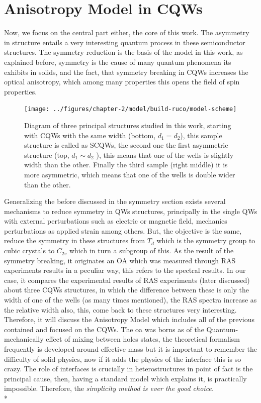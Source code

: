 \section{Anisotropy Model in CQWs}
\label{subsec:chapter-2-anisotropy-model}
\vspace{-10mm} 
Now, we focus on the central part either, the core of this work. The asymmetry in structure entails a very interesting quantum process in these semiconductor structures. The symmetry reduction is the basis of the model in this work, as explained before, symmetry is the cause of many quantum phenomena its exhibits in solids, and the fact, that symmetry breaking in \gls{CQWs} increases the optical anisotropy, which among many properties this opens the field of spin properties\cite{sivalertporn2012direct,averkiev2006spin,kotova2016optical,schonhuber2014inelastic,tronc2012spin}.\\
\begin{figure}[b]
	\centering
	\texttt{[image: ../figures/chapter-2/model/build-ruco/model-scheme]}
	\caption{Diagram of three principal structures studied in this work, starting with CQWs with the same width (bottom, $d_{1}=d_{2}$), this sample structure is called as SCQWs, the second one the first asymmetric structure (top, $d_{1}\sim d_{2}$ ), this means that one of the wells is slightly width than the other. Finally the third sample (right middle) it is more asymmetric, which means that one of the wells is double wider than the other.    }
	\label{fig:chapter-2-anisotropy-model-samples-studied}
\end{figure}
Generalizing the before discussed in the symmetry section exists several mechanisms to reduce symmetry in QWs structures, principally in the single QWs with external perturbations such as electric or magnetic field, mechanics perturbations as applied strain among others.  But, the objective is the same, reduce the symmetry in these structures from  $T_{d}$ which is the symmetry group to cubic crystals to $C_{2v}$ which in turn a  subgroup of this. As the result of the symmetry breaking,  it originates an OA which was measured through \gls{RAS} experiments results in a peculiar way, this refers to the spectral results. In our case, it compares the experimental results of \gls{RAS} experiments (later discussed) about three CQWs structures, in which the difference between these is only the width of one of the wells (as many times mentioned), the \gls{RAS} spectra increase as the relative width also,  this, come back to these structures very interesting.  Therefore, it will discuss the Anisotropy Model which includes all of the previous contained and focused on the \gls{CQWs}. The \gls{oa} was borns as of the Quantum-mechanically effect of mixing between holes states, the theoretical formalism frequently is developed around effective mass but it is important to remember the difficulty of solid physics, now if it adds the physics of the interface this is so crazy. The role of interfaces is crucially in heterostructures in point of fact is the principal cause, then, having a standard model which explains it, is practically impossible. Therefore, the \emph{simplicity method is ever the good choice.}\\*
